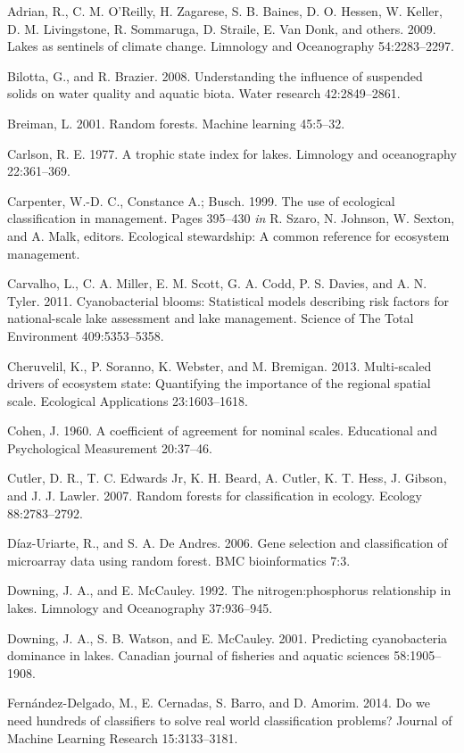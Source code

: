 \documentclass[12pt,]{article}
\begin{document}
Adrian, R., C. M. O'Reilly, H. Zagarese, S. B. Baines, D. O. Hessen, W.
Keller, D. M. Livingstone, R. Sommaruga, D. Straile, E. Van Donk, and
others. 2009. Lakes as sentinels of climate change. Limnology and
Oceanography 54:2283--2297.

Bilotta, G., and R. Brazier. 2008. Understanding the influence of
suspended solids on water quality and aquatic biota. Water research
42:2849--2861.

Breiman, L. 2001. Random forests. Machine learning 45:5--32.

Carlson, R. E. 1977. A trophic state index for lakes. Limnology and
oceanography 22:361--369.

Carpenter, W.-D. C., Constance A.; Busch. 1999. The use of ecological
classification in management. Pages 395--430 \emph{in} R. Szaro, N.
Johnson, W. Sexton, and A. Malk, editors. Ecological stewardship: A
common reference for ecosystem management.

Carvalho, L., C. A. Miller, E. M. Scott, G. A. Codd, P. S. Davies, and
A. N. Tyler. 2011. Cyanobacterial blooms: Statistical models describing
risk factors for national-scale lake assessment and lake management.
Science of The Total Environment 409:5353--5358.

Cheruvelil, K., P. Soranno, K. Webster, and M. Bremigan. 2013.
Multi-scaled drivers of ecosystem state: Quantifying the importance of
the regional spatial scale. Ecological Applications 23:1603--1618.

Cohen, J. 1960. A coefficient of agreement for nominal scales.
Educational and Psychological Measurement 20:37--46.

Cutler, D. R., T. C. Edwards Jr, K. H. Beard, A. Cutler, K. T. Hess, J.
Gibson, and J. J. Lawler. 2007. Random forests for classification in
ecology. Ecology 88:2783--2792.

D{í}az-Uriarte, R., and S. A. De Andres. 2006. Gene selection and
classification of microarray data using random forest. BMC
bioinformatics 7:3.

Downing, J. A., and E. McCauley. 1992. The nitrogen:phosphorus
relationship in lakes. Limnology and Oceanography 37:936--945.

Downing, J. A., S. B. Watson, and E. McCauley. 2001. Predicting
cyanobacteria dominance in lakes. Canadian journal of fisheries and
aquatic sciences 58:1905--1908.

Fernández-Delgado, M., E. Cernadas, S. Barro, and D. Amorim. 2014. Do we
need hundreds of classifiers to solve real world classification
problems? Journal of Machine Learning Research 15:3133--3181.
\end{document}
